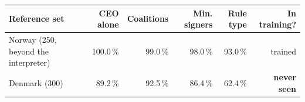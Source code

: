 \begin{tabular}{lrrrrr}
\toprule
Reference set & CEO alone & Coalitions & Min. signers & Rule type & In training? \\
\midrule
Norway (250, beyond the interpreter) & 100.0\,\% & 99.0\,\% & 98.0\,\% & 93.0\,\% & trained \\
Denmark (300) & 89.2\,\% & 92.5\,\% & 86.4\,\% & 62.4\,\% & \textbf{never seen} \\
\bottomrule
\end{tabular}
